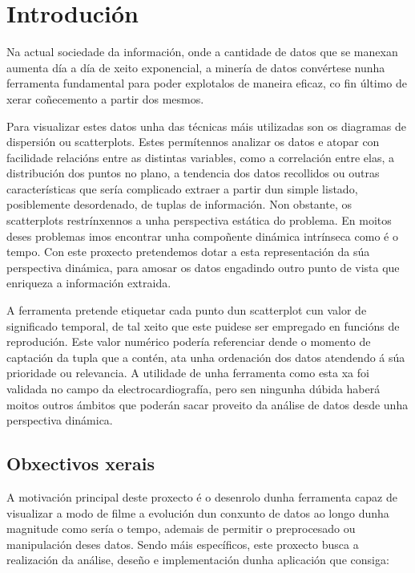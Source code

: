 \chapter{Introdución}

Na actual sociedade da información, onde a cantidade de datos que se manexan aumenta día a día de xeito exponencial, a minería de datos convértese nunha ferramenta fundamental para poder explotalos de maneira eficaz, co fin último de xerar coñecemento a partir dos mesmos.

Para visualizar estes datos unha das técnicas máis utilizadas son os diagramas de dispersión ou scatterplots. Estes permítennos analizar os datos e atopar con facilidade relacións entre as distintas variables, como a correlación entre elas, a distribución dos puntos no plano, a tendencia dos datos recollidos ou outras características que sería complicado extraer a partir dun simple listado, posiblemente desordenado, de tuplas de información. Non obstante, os scatterplots restrínxennos a unha perspectiva estática do problema. En moitos deses problemas imos encontrar unha compoñente dinámica intrínseca como é o tempo. Con este proxecto pretendemos dotar a esta representación da súa perspectiva dinámica, para amosar os datos engadindo outro punto de vista que enriqueza a información extraida.

A ferramenta pretende etiquetar cada punto dun scatterplot cun valor de significado temporal, de tal xeito que este puidese ser empregado en funcións de reprodución. Este valor numérico podería referenciar dende o momento de captación da tupla que a contén, ata unha ordenación dos datos atendendo á súa prioridade ou relevancia. A utilidade de unha ferramenta como esta xa foi validada no campo da electrocardiografía, pero sen ningunha dúbida haberá moitos outros ámbitos que poderán sacar proveito da análise de datos desde unha perspectiva dinámica.

\section{Obxectivos xerais}

A motivación principal deste proxecto é o desenrolo dunha ferramenta capaz de visualizar a modo de filme a evolución dun conxunto de datos ao longo dunha magnitude como sería o tempo, ademais de permitir o preprocesado ou manipulación deses datos. Sendo máis específicos, este proxecto busca a realización da análise, deseño e implementación dunha aplicación que consiga: 

